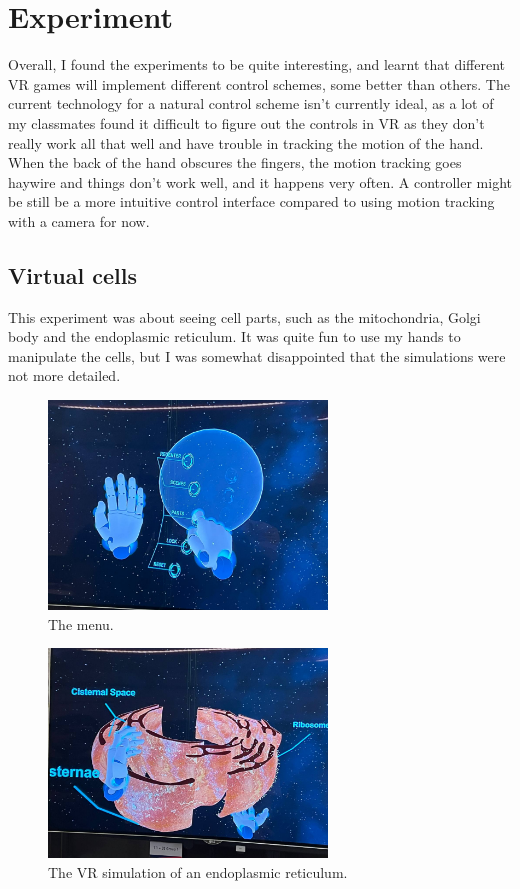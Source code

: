\documentclass[11pt]{article}
\begin{document}
\section{Experiment}
\label{sec:org2412c4f}
Overall, I found the experiments to be quite interesting, and learnt that different VR games will implement different control schemes, some better than others. The current technology for a natural control scheme isn't currently ideal, as a lot of my classmates found it difficult to figure out the controls in VR as they don't really work all that well and have trouble in tracking the motion of the hand. When the back of the hand obscures the fingers, the motion tracking goes haywire and things don't work well, and it happens very often. A controller might be still be a more intuitive control interface compared to using motion tracking with a camera for now.

 \newpage
\subsection{Virtual cells}
\label{sec:org9ed8021}
This experiment was about seeing cell parts, such as the mitochondria, Golgi body and the endoplasmic reticulum. It was quite fun to use my hands to manipulate the cells, but I was somewhat disappointed that the simulations were not more detailed.

\begin{figure}[htbp]
\centering
\includegraphics[height=15em]{./images/virtual-cell-game-menu.jpg}
\caption{The menu.}
\end{figure}

\begin{figure}[htbp]
\centering
\includegraphics[height=15em]{./images/endoplasmic-reticulum.jpg}
\caption{The VR simulation of an endoplasmic reticulum.}
\end{figure}
\end{document}

